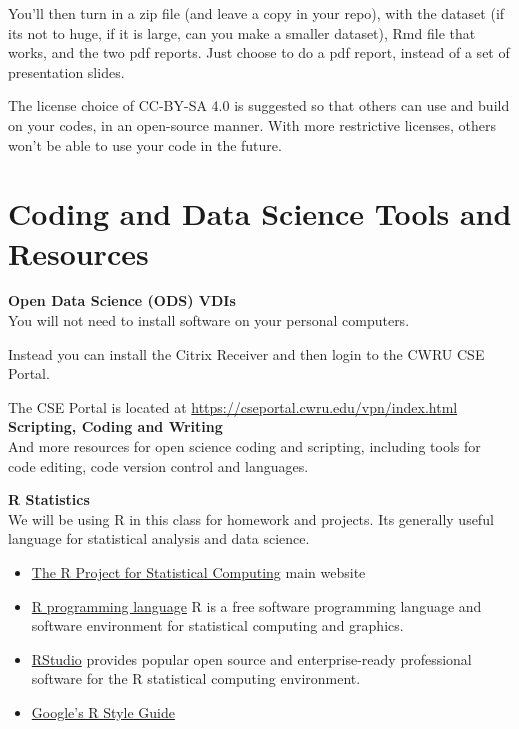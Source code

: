 \documentclass[11pt]{article} %
\begin{document}
    You'll then turn in a zip file (and leave a copy in your repo), with the dataset (if its not to huge, if it is large, can you make a smaller dataset), Rmd file that works, and the two pdf reports. 
    Just choose to do a pdf report, instead of a set of presentation slides. 
    
    The license choice of CC-BY-SA 4.0 is suggested so that others can use and build on your codes, in an open-source manner. 
    With more restrictive licenses, others won't be able to use your code in the future. 




\section{Coding and Data Science Tools and Resources}

  {\bf Open Data Science (ODS) VDIs} \\
  
  You will not need to install software on your personal computers.  
  
  Instead you can install the Citrix Receiver \cite{citrix_citrix_2014} and then login to the CWRU CSE Portal. \cite{cse_portal_cwru_2014} 
  
  The CSE Portal is located at \href{"https://cseportal.cwru.edu/vpn/index.html"}{https://cseportal.cwru.edu/vpn/index.html}    \\
  
  {\bf Scripting, Coding and Writing} \\
  And more resources for open science coding and scripting, including tools for code editing, code version control and languages. 
  
  {\bf R Statistics} \\
    We will be using R in this class for homework and projects. 
    Its generally useful language for statistical analysis and data science. 
    \begin{itemize}
    	\item \href{"http://www.r-project.org/index.html"}{The R Project for Statistical Computing}  \cite{r_r_2014} main website
    	\item \href{"http://en.wikipedia.org/wiki/R_(programming_language)"}{R programming language}  R is a free software programming language and software environment for statistical computing and graphics.\cite{r_project_r_2014} 
    	\item \href{"http://www.rstudio.com/"}{ RStudio} provides popular open source and enterprise-ready professional software for the R statistical computing environment.  \cite{rstudio_rstudio_2014}
    	\item \href{"https://google-styleguide.googlecode.com/svn/trunk/Rguide.xml"}{ Google's R Style Guide}
    \end{itemize}
  
\end{document}

